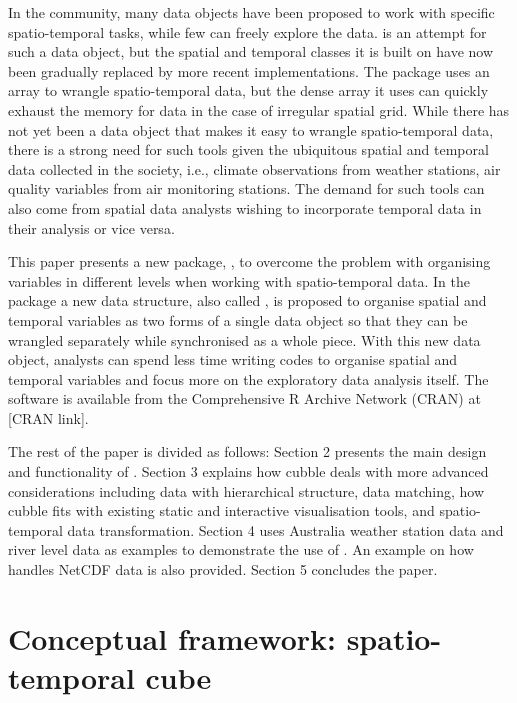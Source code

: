\documentclass[
]{jss}
\begin{document}
In the  community, many data objects have been proposed to
work with specific spatio-temporal tasks, while few can freely explore
the data.  \citep{spacetime} is an attempt for such a
data object, but the spatial and temporal classes it is built on have
now been gradually replaced by more recent implementations. The
 \citep{stars} package uses an array to wrangle
spatio-temporal data, but the dense array it uses can quickly exhaust
the memory for data in the case of irregular spatial grid. While there
has not yet been a data object that makes it easy to wrangle
spatio-temporal data, there is a strong need for such tools given the
ubiquitous spatial and temporal data collected in the society, i.e.,
climate observations from weather stations, air quality variables from
air monitoring stations. The demand for such tools can also come from
spatial data analysts wishing to incorporate temporal data in their
analysis or vice versa.

This paper presents a new  package, , to
overcome the problem with organising variables in different levels when
working with spatio-temporal data. In the package a new data structure,
also called , is proposed to organise spatial and temporal
variables as two forms of a single data object so that they can be
wrangled separately while synchronised as a whole piece. With this new
data object, analysts can spend less time writing codes to organise
spatial and temporal variables and focus more on the exploratory data
analysis itself. The software is available from the Comprehensive R
Archive Network (CRAN) at {[}CRAN link{]}.

The rest of the paper is divided as follows: Section 2 presents the main
design and functionality of . Section 3 explains how cubble
deals with more advanced considerations including data with hierarchical
structure, data matching, how cubble fits with existing static and
interactive visualisation tools, and spatio-temporal data
transformation. Section 4 uses Australia weather station data and river
level data as examples to demonstrate the use of . An
example on how  handles NetCDF data is also provided.
Section 5 concludes the paper.

\hypertarget{conceptual-framework-spatio-temporal-cube}{%
\section{Conceptual framework: spatio-temporal
cube}\label{conceptual-framework-spatio-temporal-cube}}
\end{document}
